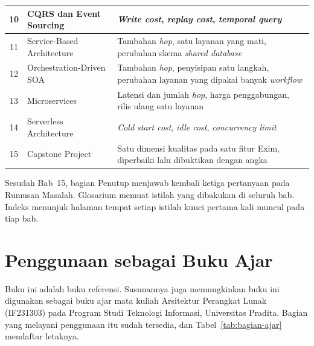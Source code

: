 \begin{table}[htbp]
\begin{tabularx}{\textwidth}{|c|>{\raggedright\arraybackslash}p{3.6cm}%
    |>{\raggedright\arraybackslash}X|}
    \hline
    10 & CQRS dan Event Sourcing & \textit{Write cost}, \textit{replay cost},
      \textit{temporal query} \\
    \hline
    11 & Service-Based Architecture & Tambahan \textit{hop}, satu layanan yang
      mati, perubahan skema \textit{shared database} \\
    \hline
    12 & Orchestration-Driven SOA & Tambahan \textit{hop}, penyisipan satu
      langkah, perubahan layanan yang dipakai banyak \textit{workflow} \\
    \hline
    13 & Microservices & Latensi dan jumlah \textit{hop}, harga penggabungan,
      rilis ulang satu layanan \\
    \hline
    14 & Serverless Architecture & \textit{Cold start cost}, \textit{idle cost},
      \textit{concurrency limit} \\
    \hline
    15 & Capstone Project & Satu dimensi kualitas pada satu fitur Exim,
      diperbaiki lalu dibuktikan dengan angka \\
    \hline
  \end{tabularx}
\end{table}

Sesudah Bab~15, bagian Penutup menjawab kembali ketiga pertanyaan pada Rumusan
Masalah. Glosarium memuat istilah yang dibakukan di seluruh bab. Indeks menunjuk
halaman tempat setiap istilah kunci pertama kali muncul pada tiap bab.

\section*{Penggunaan sebagai Buku Ajar}

Buku ini adalah buku referensi. Susunannya juga memungkinkan buku ini digunakan
sebagai buku ajar mata kuliah Arsitektur Perangkat Lunak (IF231303) pada Program
Studi Teknologi Informasi, Universitas Pradita. Bagian yang melayani penggunaan
itu sudah tersedia, dan Tabel~\ref{tab:bagian-ajar} mendaftar letaknya.

